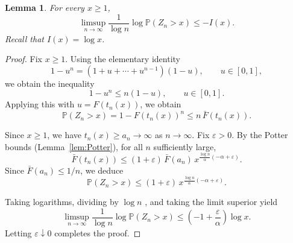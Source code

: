 \documentclass[10pt,a4paper]{amsart}
\newtheorem{lemma}{Lemma}
\newcommand{\PP}{\mathbb{P}}
\begin{document}
\begin{lemma}\label{lem:limsup}
For every \(x \ge 1\),
\[
\limsup_{n\to\infty}\frac{1}{\log n}\log \PP(Z_n>x)\le -I(x).
\]
Recall that $I(x)=\log x$.
\end{lemma}

\begin{proof}
Fix \(x\ge1\).
Using the elementary identity
\[
1-u^n=(1+u+\cdots+u^{n-1})(1-u), \qquad u\in[0,1],
\]
we obtain the inequality
\[
1-u^n \le n(1-u), \qquad u\in[0,1].
\]
Applying this with \(u=F(t_n(x))\), we obtain
\[
\PP(Z_n>x)
=
1-F(t_n(x))^n
\le
n\,\bar F(t_n(x)).
\]

Since \(x\ge1\), we have \(t_n(x)\ge a_n\to\infty\) as \(n\to\infty\).
Fix \(\varepsilon>0\). By the Potter bounds (Lemma~\ref{lem:Potter}), for all \(n\) sufficiently large,
\[
\bar F(t_n(x))
\le
(1+\varepsilon)\,\bar F(a_n)\,x^{\frac{\log n}{\alpha}(-\alpha+\varepsilon)}.
\]
Since \(\bar F(a_n)\le 1/n\), we deduce
\[
\PP(Z_n>x)
\le
(1+\varepsilon)\,x^{\frac{\log n}{\alpha}(-\alpha+\varepsilon)}.
\]

Taking logarithms, dividing by \(\log n\) , and taking the limit superior yield 
\[
\limsup_{n\to\infty}
\frac{1}{\log n}\log \PP(Z_n>x)
\le
\left(-1+\frac{\varepsilon}{\alpha}\right)\log x.
\]
Letting \(\varepsilon\downarrow0\) completes the proof.
\end{proof}
\end{document}
